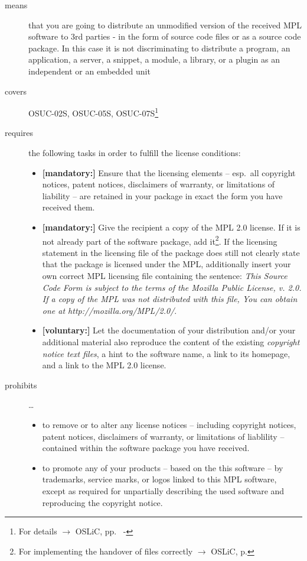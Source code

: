 \begin{description}

\item[means] that you are going to distribute an unmodified version of the
received MPL software to 3rd parties - in the form of source code files or as a
source code package. In this case it is not discriminating to distribute a
program, an application, a server, a snippet, a module, a library, or a plugin
as an independent or an embedded unit

\item[covers] OSUC-02S, OSUC-05S, OSUC-07S\footnote{For details $\rightarrow$
OSLiC, pp.\ \pageref{OSUC-02S-DEF} - \pageref{OSUC-07S-DEF}}

\item[requires] the following tasks in order to fulfill the license conditions:
\begin{itemize}
  
  \item \textbf{[mandatory:]} Ensure that the licensing elements -- esp.\ all
  copyright notices, patent notices, disclaimers of warranty, or limitations of
  liability -- are retained in your package in exact the form you have received
  them.

  \item \textbf{[mandatory:]} Give the recipient a copy of the MPL 2.0 license.
  If it is not already part of the software package, add it\footnote{For
  implementing the handover of files correctly $\rightarrow$ OSLiC, p.
  \pageref{DistributingFilesHint}}. If the licensing statement in the licensing
  file of the package does still not clearly state that the package is licensed
  under the MPL, additionally insert your own correct MPL licensing file
  containing the sentence: \emph{This Source Code Form is subject to the terms
  of the Mozilla Public License, v. 2.0. If a copy of the MPL was not
  distributed with this file, You can obtain one at
  http://mozilla.org/MPL/2.0/}.

  \item \textbf{[voluntary:]} Let the documentation of your distribution and/or
  your additional material also reproduce the content of the existing
  \emph{copyright notice text files}, a hint to the software name, a link to its
  homepage, and a link to the MPL 2.0 license.
\end{itemize}

\item[prohibits] \ldots
\begin{itemize}
  \item to remove or to alter any license notices -- including copyright
  notices, patent notices, disclaimers of warranty, or limitations of liablility
  -- contained within the software package you have received.
  \item to promote any of your products -- based on the this software -- by
  trademarks, service marks, or logos linked to this MPL software, except as
  required for unpartially describing the used software and reproducing the
  copyright notice.
\end{itemize}
\end{description}


